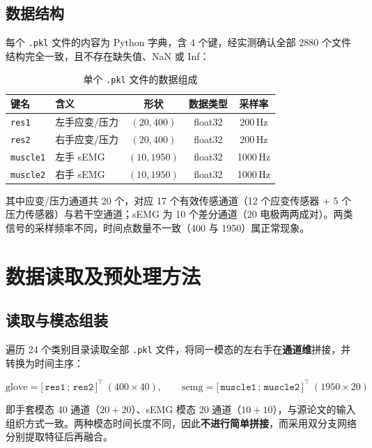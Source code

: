 \documentclass[11pt,a4paper]{ctexart}
\begin{document}
\subsection{数据结构}

每个 \texttt{.pkl} 文件的内容为 Python 字典，含 4 个键，经实测确认全部 2880 个文件结构完全一致，且不存在缺失值、NaN 或 Inf：

\begin{table}[htbp]\centering
\caption{单个 \texttt{.pkl} 文件的数据组成}
\label{tab:data}
\begin{tabular}{llccc}
\toprule
键名 & 含义 & 形状 & 数据类型 & 采样率 \\
\midrule
\texttt{res1} & 左手应变/压力 & $(20,400)$ & float32 & 200\,Hz \\
\texttt{res2} & 右手应变/压力 & $(20,400)$ & float32 & 200\,Hz \\
\texttt{muscle1} & 左手 sEMG & $(10,1950)$ & float32 & 1000\,Hz \\
\texttt{muscle2} & 右手 sEMG & $(10,1950)$ & float32 & 1000\,Hz \\
\bottomrule
\end{tabular}
\end{table}

其中应变/压力通道共 20 个，对应 17 个有效传感通道（12 个应变传感器 + 5 个压力传感器）与若干空通道；sEMG 为 10 个差分通道（20 电极两两成对）。两类信号的采样频率不同，时间点数量不一致（400 与 1950）属正常现象。

\section{数据读取及预处理方法}

\subsection{读取与模态组装}

遍历 24 个类别目录读取全部 \texttt{.pkl} 文件，将同一模态的左右手在\textbf{通道维}拼接，并转换为时间主序：

\begin{equation}
\text{glove} = \big[\,\texttt{res1}\,;\,\texttt{res2}\,\big]^{\!\top}\ (400\times40),
\qquad
\text{semg} = \big[\,\texttt{muscle1}\,;\,\texttt{muscle2}\,\big]^{\!\top}\ (1950\times20)
\end{equation}

即手套模态 40 通道（$20+20$）、sEMG 模态 20 通道（$10+10$），与源论文的输入组织方式一致。两种模态时间长度不同，因此\textbf{不进行简单拼接}，而采用双分支网络分别提取特征后再融合。
\end{document}
